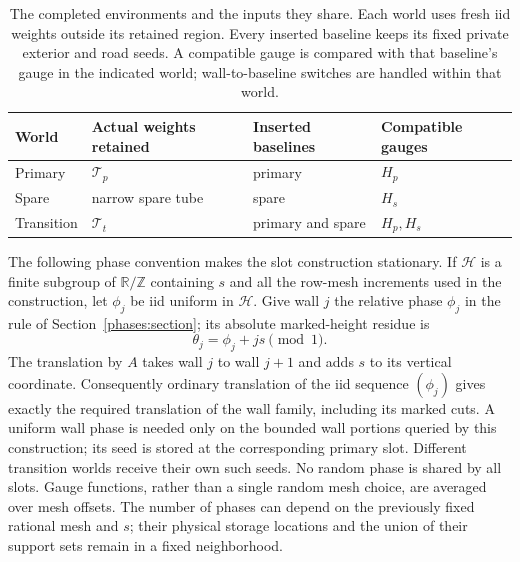 \begin{table}[htbp]
\centering
\small
\begin{tabular}{@{}p{0.9in}p{1.7in}p{1.4in}p{1.4in}@{}}
\toprule
World & Actual weights retained & Inserted baselines & Compatible gauges \\
\midrule
Primary & $\mathcal T_p$ & primary & $H_p$ \\
Spare & narrow spare tube & spare & $H_s$ \\
Transition & $\mathcal T_t$ & primary and spare & $H_p,H_s$ \\
\bottomrule
\end{tabular}
\caption{The completed environments and the inputs they share. Each
world uses fresh iid weights outside its retained region. Every inserted
baseline keeps its fixed private exterior and road seeds. A compatible
gauge is compared with that baseline's gauge in the indicated world;
wall-to-baseline switches are handled within that world.}
\label{improvement:table-worlds}
\end{table}

The following phase convention makes the slot construction stationary. If $\mathcal H$ is a finite subgroup
of $\mathbb R/\mathbb Z$ containing $s$ and all the row-mesh increments
used in the construction, let $\phi_j$ be iid uniform in $\mathcal H$.
Give wall $j$ the relative phase $\phi_j$ in the rule of
Section~\ref{phases:section}; its absolute marked-height residue is
\begin{equation}
 \theta_j=\phi_j+js\pmod1.
 \label{improvement:worlds:eq1}
\end{equation}
The translation by $A$ takes wall $j$ to wall $j+1$ and adds $s$ to its
vertical coordinate. Consequently ordinary translation of the iid
sequence $(\phi_j)$ gives exactly the required translation of the
wall family, including its marked cuts. A uniform wall phase is
needed only on the bounded wall portions queried by this construction;
its seed is stored at the corresponding primary slot. Different
transition worlds receive their own such seeds. No random phase is
shared by all slots. Gauge functions, rather than a single random
mesh choice, are averaged over mesh offsets. The number of phases
can depend on the previously fixed rational mesh and $s$; their
physical storage locations and the union of their support sets remain
in a fixed neighborhood.

